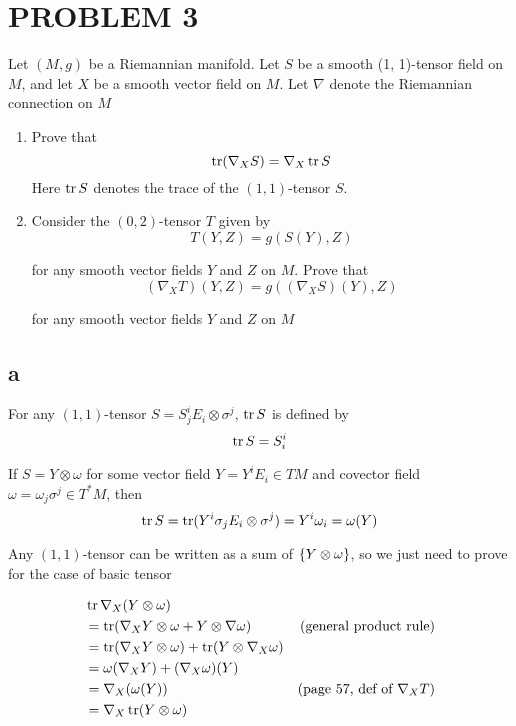 \section{PROBLEM 3}

\begin{problem}
	Let $(M, g)$ be a Riemannian manifold. Let $S$ be a smooth (1, 1)-tensor field on $M$, and let $X$ be a smooth vector field on $M$. Let $\nabla$ denote the Riemannian connection on $M$
	\begin{enumerate}[label=(\alph*)]
		\item Prove that
		$$
			\operatorname{tr} (\nabla_X S) = \nabla_X \operatorname{tr} S
		$$
		Here $\operatorname{tr} S$ denotes the trace of the $(1, 1)$-tensor $S$.
		\item Consider the $(0, 2)$-tensor $T$ given by
		$$
			T(Y, Z) = g(S(Y), Z)
		$$
		
		for any smooth vector fields $Y$ and $Z$ on $M$. Prove that
		$$
			(\nabla_X T)(Y, Z) = g((\nabla_X S)(Y), Z)
		$$
		
		for any smooth vector fields $Y$ and $Z$ on $M$
	\end{enumerate}
\end{problem}

\subsection{a}

For any $(1, 1)$-tensor $S = S^i_j E_i \otimes \sigma^j$, $\operatorname{tr} S$ is defined by
$$
	\operatorname{tr} S = S^i_i
$$

If $S = Y \otimes \omega$ for some vector field $Y = Y^i E_i \in TM$ and covector field $\omega = \omega_j \sigma^j \in T^* M$, then
$$
	\operatorname{tr} S = \operatorname{tr}(Y^i \sigma_j E_i \otimes \sigma^j) = Y^i \omega_i = \omega(Y)
$$

Any $(1, 1)$-tensor can be written as a sum of $\{Y \otimes \omega\}$, so we just need to prove for the case of basic tensor

\begin{align*}
	&\operatorname{tr} \nabla_X (Y \otimes \omega) \\
	&= \operatorname{tr}(\nabla_X Y \otimes \omega + Y \otimes \nabla \omega) &\text{(general product rule)} \\
	&= \operatorname{tr}(\nabla_X Y \otimes \omega) + \operatorname{tr}(Y \otimes \nabla_X \omega) \\
	&= \omega(\nabla_X Y) + (\nabla_X \omega)(Y) \\
	&= \nabla_X (\omega(Y)) &\text{(page 57, def of $\nabla_X T$)} \\
	&= \nabla_X \operatorname{tr} (Y \otimes \omega)
\end{align*}

